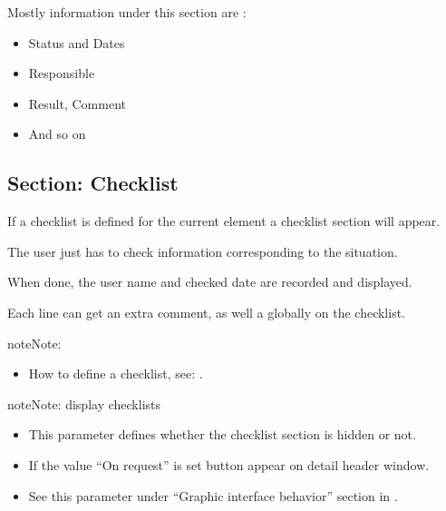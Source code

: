\documentclass[letterpaper,10pt,english]{sphinxmanual}
\begin{document}
Mostly information under this section are :
\begin{itemize}
\item {} 
Status and Dates

\item {} 
Responsible

\item {} 
Result, Comment

\item {} 
And so on

\end{itemize}


\subsection{Section: Checklist}
\label{Gui:gui-checklist-section-label}\label{Gui:section-checklist}
If a checklist is defined for the current element a checklist section will appear.

The user just has to check information corresponding to the situation.

When done, the user name and checked date are recorded and displayed.

Each line can get an extra comment, as well a globally on the checklist.

\begin{notice}{note}{Note:}\begin{itemize}
\item {} 
How to define a checklist, see: {\hyperref[ControlAutomation:ctrlauto-checklist-def-label]{\emph{}}}.

\end{itemize}
\end{notice}

\begin{notice}{note}{Note:}
display checklists
\begin{itemize}
\item {} 
This parameter defines whether the checklist section is hidden or not.

\item {} 
If the value ``On request'' is set  button appear on detail header window.

\item {} 
See this parameter under ``Graphic interface behavior'' section in {\hyperref[UserParameter:user-parameters-label]{\emph{}}}.

\end{itemize}
\end{notice}
\newpage
\end{document}
